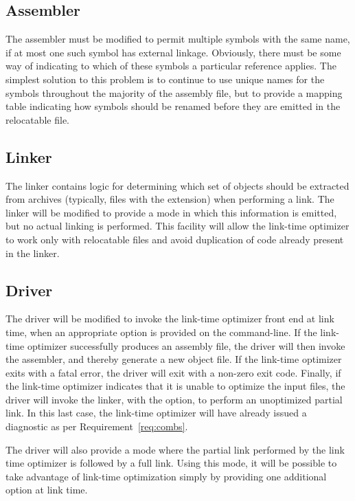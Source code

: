 \subsection{Assembler}

The assembler must be modified to permit multiple symbols with the
same name, if at most one such symbol has external linkage.
Obviously, there must be some way of indicating to which of these
symbols a particular reference applies.  The simplest solution to this
problem is to continue to use unique names for the symbols throughout
the majority of the assembly file, but to provide a mapping table
indicating how symbols should be renamed before they are emitted in
the relocatable file.

\subsection{Linker}

The linker contains logic for determining which set of objects should
be extracted from archives (typically, files with the 
extension) when performing a link.  The linker will be modified to
provide a mode in which this information is emitted, but no actual
linking is performed.  This facility will allow the link-time
optimizer to work only with relocatable files and avoid duplication of
code already present in the linker.

\subsection{Driver}

The driver will be modified to invoke the link-time optimizer front
end at link time, when an appropriate option is provided on the
command-line.  If the link-time optimizer successfully produces an
assembly file, the driver will then invoke the assembler, and
thereby generate a new object file.  If the link-time optimizer exits
with a fatal error, the driver will exit with a non-zero exit code.
Finally, if the link-time optimizer indicates that it is unable to
optimize the input files, the driver will invoke the linker, with the
 option, to perform an unoptimized partial link.  In this
last case, the link-time optimizer will have already issued a
diagnostic as per Requirement~\ref{req:combs}.

The driver will also provide a mode where the partial link performed
by the link time optimizer is followed by a full link.  Using this
mode, it will be possible to take advantage of link-time optimization
simply by providing one additional option at link time.
